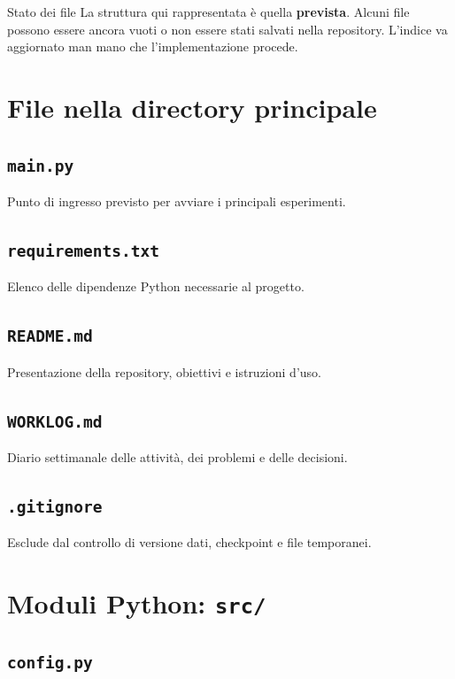 \documentclass[10pt,a4paper,oneside]{book}
\begin{document}
\begin{warningbox}{Stato dei file}
La struttura qui rappresentata è quella \textbf{prevista}. Alcuni file possono
essere ancora vuoti o non essere stati salvati nella repository. L'indice
va aggiornato man mano che l'implementazione procede.
\end{warningbox}


\section{File nella directory principale}

\subsection{\texttt{main.py}}

Punto di ingresso previsto per avviare i principali esperimenti.

\subsection{\texttt{requirements.txt}}

Elenco delle dipendenze Python necessarie al progetto.

\subsection{\texttt{README.md}}

Presentazione della repository, obiettivi e istruzioni d'uso.

\subsection{\texttt{WORKLOG.md}}

Diario settimanale delle attività, dei problemi e delle decisioni.

\subsection{\texttt{.gitignore}}

Esclude dal controllo di versione dati, checkpoint e file temporanei.


\section{Moduli Python: \texttt{src/}}

\subsection{\texttt{config.py}}
\end{document}
